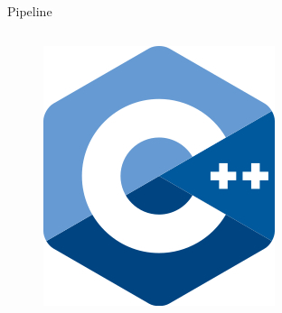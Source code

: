 \documentclass[aspectratio=169,xcolor=dvipsnames]{beamer}
\begin{document}
\begin{frame}{Pipeline}
\begin{columns}[T]
\begin{column}{.31\textwidth}
			\begin{figure}
				\includegraphics[width=0.35\linewidth, trim={0 0 0 0cm}, clip]{Images/cpp.png}
			\end{figure}
		\end{column}%
	\end{columns}
\end{frame}
\end{document}

